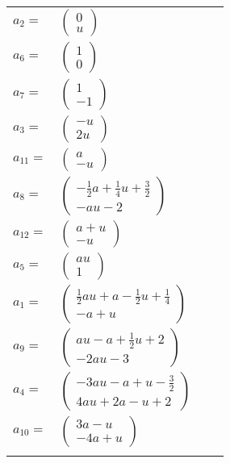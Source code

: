 \documentclass[1p]{elsarticle_modified}
\theoremstyle{definition}
\begin{document}
\begin{tabular}{m{7pt} m{180pt} m{7pt} m{180pt} }
\flushright $a_{2}=$&$\begin{pmatrix}0\\u\end{pmatrix}$ \\
\flushright $a_{6}=$&$\begin{pmatrix}1\\0\end{pmatrix}$ \\
\flushright $a_{7}=$&$\begin{pmatrix}1\\-1\end{pmatrix}$ \\
\flushright $a_{3}=$&$\begin{pmatrix}- u\\2 u\end{pmatrix}$ \\
\flushright $a_{11}=$&$\begin{pmatrix}a\\- u\end{pmatrix}$ \\
\flushright $a_{8}=$&$\begin{pmatrix}-\frac{1}{2} a+\frac{1}{4} u+\frac{3}{2}\\- a u-2\end{pmatrix}$ \\
\flushright $a_{12}=$&$\begin{pmatrix}a+u\\- u\end{pmatrix}$ \\
\flushright $a_{5}=$&$\begin{pmatrix}a u\\1\end{pmatrix}$ \\
\flushright $a_{1}=$&$\begin{pmatrix}\frac{1}{2} a u+a-\frac{1}{2} u+\frac{1}{4}\\- a+u\end{pmatrix}$ \\
\flushright $a_{9}=$&$\begin{pmatrix}a u- a+\frac{1}{2} u+2\\-2 a u-3\end{pmatrix}$ \\
\flushright $a_{4}=$&$\begin{pmatrix}-3 a u- a+u-\frac{3}{2}\\4 a u+2 a- u+2\end{pmatrix}$ \\
\flushright $a_{10}=$&$\begin{pmatrix}3 a- u\\-4 a+u\end{pmatrix}$\\&\end{tabular}
\end{document}
